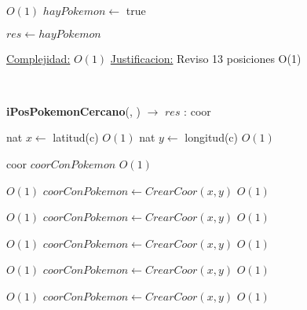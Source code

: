 \begin{Algoritmos}
\begin{algorithmic}[1]
    \EndIf
\EndIf

         \Comment $O(1)$
        \State $hayPokemon \gets$ true
    \EndIf
\EndIf

\State $res \gets hayPokemon$

\medskip
\State \underline{Complejidad:} $O(1)$ %
\State \underline{Justificacion:} Reviso 13 posiciones O(1)

\end{algorithmic}

$ $\newline
$ $\newline
$ $\newline



{\textbf{iPosPokemonCercano}(, ) $\to$ $res$ : coor}
\begin{algorithmic}[1]

\State nat $x \gets$ latitud(c)    \Comment $O(1)$
\State nat $y \gets$ longitud(c)   \Comment $O(1)$


\State coor $coorConPokemon$    \Comment $O(1)$

     \Comment $O(1)$
    \State $coorConPokemon \gets CrearCoor(x, y)$    \Comment $O(1)$
\EndIf

         \Comment $O(1)$
        \State $coorConPokemon \gets CrearCoor(x, y)$    \Comment $O(1)$
    \EndIf


             \Comment $O(1)$
            \State $coorConPokemon \gets CrearCoor(x, y)$    \Comment $O(1)$
        \EndIf

    \EndIf

             \Comment $O(1)$
            \State $coorConPokemon \gets CrearCoor(x, y)$    \Comment $O(1)$
        \EndIf
    \EndIf

             \Comment $O(1)$
            \State $coorConPokemon \gets CrearCoor(x, y)$    \Comment $O(1)$
        \EndIf
    \EndIf


\end{algorithmic}
\end{Algoritmos}
